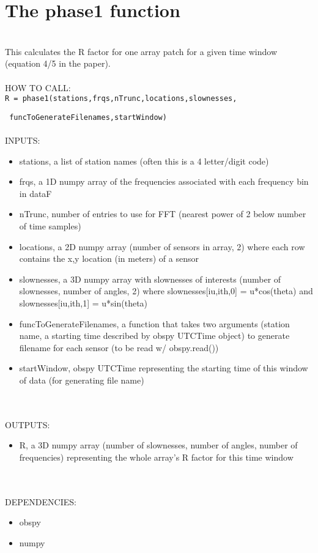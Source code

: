 \documentclass{article}
\begin{document}
\section{The phase1 function}
\\
This calculates the R factor for one array patch for a given time window (equation 4/5 in the paper).
\\
\\
HOW TO CALL:
\\
\texttt{R = phase1(stations,frqs,nTrunc,locations,slownesses,}

\texttt{   funcToGenerateFilenames,startWindow)}
\\
\\
INPUTS:
\begin{itemize}
	\item stations, a list of station names (often this is a 4 letter/digit code)
	\item frqs, a 1D numpy array of the frequencies associated with each frequency bin in dataF 
	\item nTrunc, number of entries to use for FFT (nearest power of 2 below number of time samples)
	\item locations, a 2D numpy array (number of sensors in array, 2) where each row contains the x,y location (in meters) of a sensor
	\item slownesses, a 3D numpy array with slownesses of interests (number of slownesses, number of angles, 2) where slownesses[iu,ith,0] = u*cos(theta) and slownesses[iu,ith,1] = u*sin(theta)
	\item funcToGenerateFilenames, a function that takes two arguments (station name, a starting time described by obspy UTCTime object) to generate filename for each sensor (to be read w/ obspy.read())
	\item startWindow, obspy UTCTime representing the starting time of this window of data (for generating file name)
\end{itemize}
\\
\\
OUTPUTS:
\begin{itemize}
    \item R, a 3D numpy array (number of slownesses, number of angles, number of frequencies) representing the whole array's R factor for this time window
\end{itemize}
\\
\\
DEPENDENCIES:
\begin{itemize}
    \item obspy
    \item numpy
\end{itemize}
\\
\\
\end{document}
